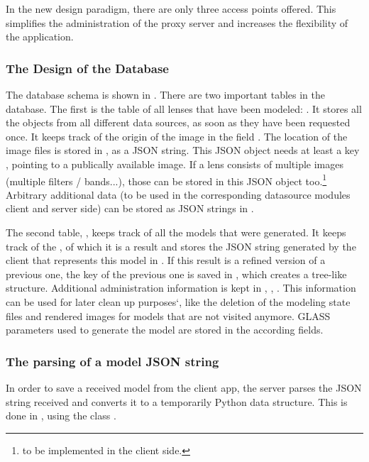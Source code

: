 In the new design paradigm, there are only three access points offered. This simplifies the administration of the proxy server and increases the flexibility of the application.




\subsubsection{The Design of the Database}



The database schema is shown in .
There are two important tables in the database.
The first is the table of all lenses that have been modeled: .
It stores all the objects from all different data sources, as soon as they have been requested once.
It keeps track of the origin of the image in the field .
The location of the image files is stored in , as a JSON string.
This JSON object needs at least a key , pointing to a publically available image.
If a lens consists of multiple images (multiple filters / bands...), those can be stored in this JSON object too.\footnote{to be implemented in the client side.}
Arbitrary additional data (to be used in the corresponding datasource modules client and server side) can be stored as JSON strings in .

The second table, , keeps track of all the models that were generated.
It keeps track of the , of which it is a result and stores the JSON string generated by the client that represents this model in .
If this result is a refined version of a previous one, the key of the previous one is saved in , which creates a tree-like structure.
Additional administration information is kept in , , .
This information can be used for later clean up purposes`, like the deletion of the modeling state files and rendered images for models that are not visited anymore.
GLASS parameters used to generate the model are stored in the according fields.


\subsubsection{The parsing of a model JSON string}

In order to save a received model from the client app, the server parses the JSON string received and converts it to a temporarily Python data structure.
This is done in , using the class .

